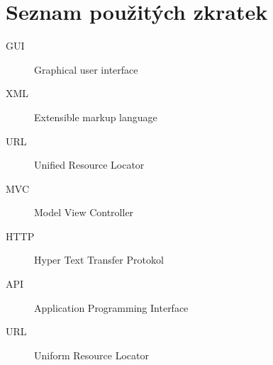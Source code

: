 \chapter{Seznam použitých zkratek}
\begin{description}
	\item[GUI] Graphical user interface
	\item[XML] Extensible markup language
	\item[URL] Unified Resource Locator
	\item[MVC] Model View Controller
	\item[HTTP] Hyper Text Transfer Protokol
	\item[API] Application Programming Interface
	\item[URL] Uniform Resource Locator
\end{description}